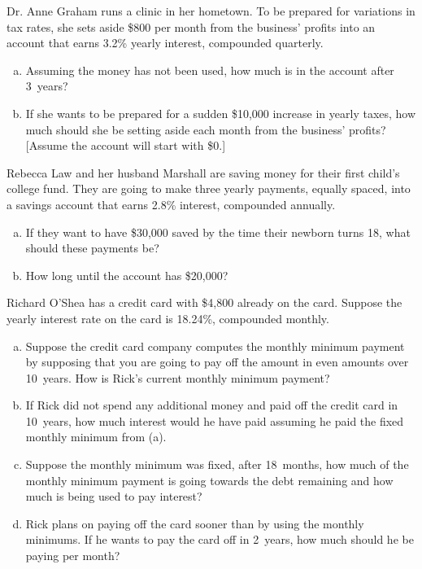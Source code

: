 \documentclass[11pt,letterpaper]{article}
\begin{document}

 Dr. Anne Graham runs a clinic in her hometown. To be prepared for variations in tax rates, she sets aside \$800 per month from the business' profits into an account that earns 3.2\% yearly interest, compounded quarterly. 
\begin{enumerate}[(a)]
\item Assuming the money has not been used, how much is in the account after 3~years?
\item If she wants to be prepared for a sudden \$10,000 increase in yearly taxes, how much should she be setting aside each month from the business' profits? [Assume the account will start with \$0.]
\end{enumerate}





\newpage





 Rebecca Law and her husband Marshall are saving money for their first child's college fund. They are going to make three yearly payments, equally spaced, into a savings account that earns 2.8\% interest, compounded annually. 
\begin{enumerate}[(a)]
\item If they want to have \$30,000 saved by the time their newborn turns 18, what should these payments be?
\item How long until the account has \$20,000?
\end{enumerate}





\newpage





 Richard O'Shea has a credit card with \$4,800 already on the card. Suppose the yearly interest rate on the card is 18.24\%, compounded monthly. 
\begin{enumerate}[(a)]
\item Suppose the credit card company computes the monthly minimum payment by supposing that you are going to pay off the amount in even amounts over 10~years. How is Rick's current monthly minimum payment?
\item If Rick did not spend any additional money and paid off the credit card in 10~years, how much interest would he have paid assuming he paid the fixed monthly minimum from (a).
\item Suppose the monthly minimum was fixed, after 18~months, how much of the monthly minimum payment is going towards the debt remaining and how much is being used to pay interest?
\item Rick plans on paying off the card sooner than by using the monthly minimums. If he wants to pay the card off in 2~years, how much should he be paying per month?
\end{enumerate}
\end{document}
